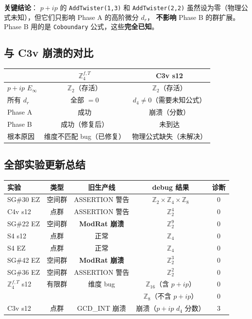 \documentclass[a4paper,fontset=ubuntu,12pt]{ctexart}
\begin{document}
\textbf{关键结论}：
$p{+}ip$ 的 \texttt{AddTwister(1,3)} 和 \texttt{AddTwister(2,2)}
虽然设为零（物理公式未知），但它们只影响 Phase A 的高阶微分 $d_r$，
\textbf{不影响} Phase B 的群扩展。
Phase B 用的是 \texttt{Coboundary} 公式，这些\textbf{完全已知}。

\subsection{与 C3v 崩溃的对比}

\begin{center}
\begin{tabular}{l|cc}
\hline
& $\mathbb{Z}_4^{f,T}$ & C3v s12 \\
\hline
$p{+}ip$ $E_\infty$ & $\mathbb{Z}_2$（存活） & $\mathbb{Z}_2$（存活） \\
所有 $d_r$ & 全部 $= 0$ & $d_4 \neq 0$（需要未知公式） \\
Phase A & 成功 & 崩溃（分数） \\
Phase B & 成功（修复后） & 未到达 \\
根本原因 & 维度不匹配 bug（已修复） & 物理公式缺失（未解决） \\
\hline
\end{tabular}
\end{center}

\subsection{全部实验更新总结}

\begin{center}
\begin{tabular}{l|cccc}
\hline
实验 & 类型 & 旧生产线 & debug 结果 & 诊断 \\
\hline
SG\#30 EZ & 空间群 & ASSERTION 警告 & $\mathbb{Z}_2 \times \mathbb{Z}_4 \times \mathbb{Z}_8$ & 0 \\
C4v s12 & 点群 & ASSERTION 警告 & $\mathbb{Z}_2^4$ & 0 \\
SG\#22 EZ & 空间群 & \textbf{ModRat 崩溃} & $\mathbb{Z}_2^9$ & 0 \\
S4 s12 & 点群 & 正常 & $\mathbb{Z}_4$ & 0 \\
S4 EZ & 点群 & 正常 & $\mathbb{Z}_4$ & 0 \\
SG\#42 EZ & 空间群 & \textbf{ModRat 崩溃} & $\mathbb{Z}_2^3$ & 0 \\
SG\#36 EZ & 空间群 & ASSERTION 警告 & $\mathbb{Z}_2^2$ & 0 \\
$\mathbb{Z}_4^{f,T}$ s12 & 有限群 & 维度 bug & $\mathbb{Z}_{16}$（含 $p{+}ip$） & 0 \\
 & & & $\mathbb{Z}_8$（不含 $p{+}ip$） & 0 \\
C3v s12 & 点群 & GCD\_INT 崩溃 & 崩溃（$p{+}ip$ $d_4$ 分数） & 3 \\
\hline
\end{tabular}
\end{center}
\end{document}
